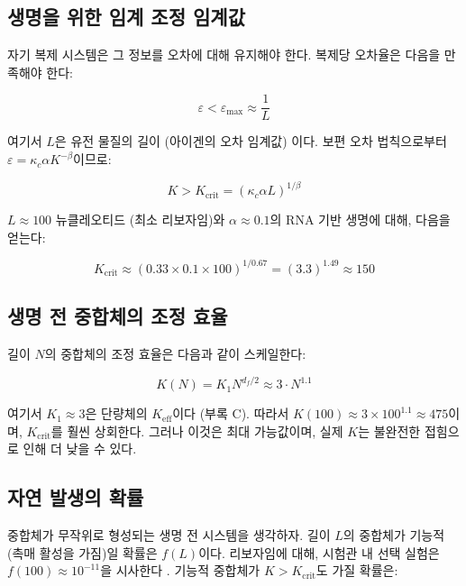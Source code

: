 \documentclass[12pt,a4paper]{article}
\newcommand{\Keff}{K_{\mathrm{eff}}}
\newcommand{\kappac}{\kappa_c}
\newcommand{\eps}{\varepsilon}
\newcommand{\df}{d_{\!f}}
\theoremstyle{remark}
\begin{document}
	\subsection{생명을 위한 임계 조정 임계값}
	
	자기 복제 시스템은 그 정보를 오차에 대해 유지해야 한다. 복제당 오차율은 다음을 만족해야 한다:
	
	\begin{equation}
		\eps < \eps_{\text{max}} \approx \frac{1}{L}
		\label{eq:error-threshold}
	\end{equation}
	
	여기서 \(L\)은 유전 물질의 길이 (아이겐의 오차 임계값) \cite{Eigen1971}이다. 보편 오차 법칙으로부터 \(\eps = \kappac \alpha K^{-\beta}\)이므로:
	
	\begin{equation}
		K > K_{\text{crit}} = \left( \kappac \alpha L \right)^{1/\beta}
		\label{eq:Kcrit-life}
	\end{equation}
	
	\(L \approx 100\) 뉴클레오티드 (최소 리보자임)와 \(\alpha \approx 0.1\)의 RNA 기반 생명에 대해, 다음을 얻는다:
	
	\begin{equation}
		K_{\text{crit}} \approx (0.33 \times 0.1 \times 100)^{1/0.67} = (3.3)^{1.49} \approx 150
		\label{eq:Kcrit-life-num}
	\end{equation}
	
	\subsection{생명 전 중합체의 조정 효율}
	
	길이 \(N\)의 중합체의 조정 효율은 다음과 같이 스케일한다:
	
	\begin{equation}
		K(N) = K_1 N^{\df/2} \approx 3 \cdot N^{1.1}
		\label{eq:K-polymer}
	\end{equation}
	
	여기서 \(K_1 \approx 3\)은 단량체의 \(\Keff\)이다 (부록 C). 따라서 \(K(100) \approx 3 \times 100^{1.1} \approx 475\)이며, \(K_{\text{crit}}\)를 훨씬 상회한다. 그러나 이것은 최대 가능값이며, 실제 \(K\)는 불완전한 접힘으로 인해 더 낮을 수 있다.
	
	\subsection{자연 발생의 확률}
	
	중합체가 무작위로 형성되는 생명 전 시스템을 생각하자. 길이 \(L\)의 중합체가 기능적 (촉매 활성을 가짐)일 확률은 \(f(L)\)이다. 리보자임에 대해, 시험관 내 선택 실험은 \(f(100) \approx 10^{-11}\)을 시사한다 \cite{Joyce2002}. 기능적 중합체가 \(K > K_{\text{crit}}\)도 가질 확률은:
	
\end{document}
